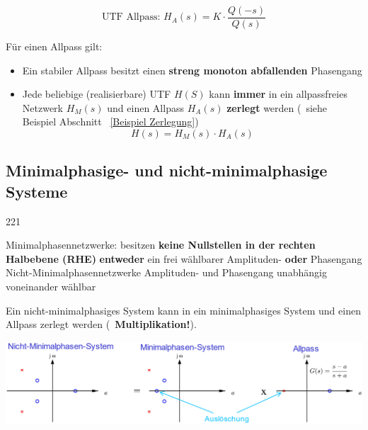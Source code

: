 $$ \boxed{ \text{UTF Allpass: } H_A(s) = K \cdot \frac{Q(-s)}{Q(s)} } $$

Für einen Allpass gilt:
\begin{itemize}
    \item Ein stabiler Allpass besitzt einen \textbf{streng monoton abfallenden} Phasengang
    \item Jede beliebige (realisierbare) UTF $H(S)$ kann \textbf{immer} in ein allpassfreies Netzwerk $H_M(s)$ und einen Allpass $H_A(s)$
        \textbf{zerlegt} werden (\textrightarrow\ siehe Beispiel Abschnitt ~\ref{Beispiel Zerlegung})
        $$ \boxed{ H(s) = H_M(s) \cdot H_A(s) }$$
\end{itemize}


\subsection{Minimalphasige- und nicht-minimalphasige Systeme}{221}

\begin{outline}
    \1 Minimalphasennetzwerke: 
        \2 besitzen \textbf{keine Nullstellen in der rechten Halbebene (RHE)}
        \2 \textbf{entweder} ein frei wählbarer Amplituden- \textbf{oder} Phasengang
    \1 Nicht-Minimalphasennetzwerke
        \2 Amplituden- und Phasengang unabhängig voneinander wählbar
\end{outline}


\label{Beispiel Zerlegung}

Ein nicht-minimalphasiges System kann in ein minimalphasiges System und einen Allpass zerlegt werden
(\textrightarrow\ \textbf{Multiplikation!}). 

\includegraphics[width=\columnwidth]{images/beispiel_minimalphasensystem.png}



